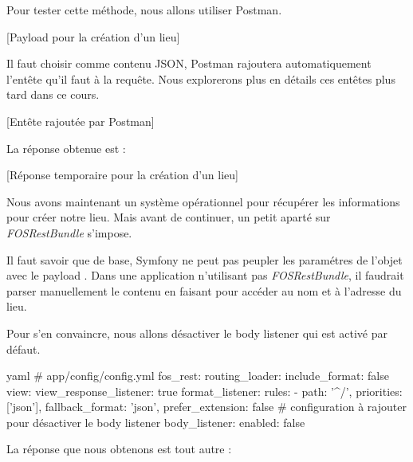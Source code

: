 \documentclass[big]{zmdocument}
\begin{document}
Pour tester cette méthode, nous allons utiliser Postman.



[Payload pour la création d'un lieu]


Il faut choisir comme contenu JSON, Postman rajoutera automatiquement l'entête  qu'il faut à la requête. Nous explorerons plus en détails ces entêtes plus tard dans ce cours.



[Entête rajoutée par Postman]


La réponse obtenue est :



[Réponse temporaire pour la création d'un lieu]


Nous avons maintenant un système opérationnel pour récupérer les informations pour créer notre lieu. Mais avant de continuer, un petit aparté sur \textit{FOSRestBundle} s'impose.





Il faut savoir que de base, Symfony ne peut pas peupler les paramétres de l'objet  avec le payload . Dans une application n'utilisant pas \textit{FOSRestBundle}, il faudrait parser manuellement le contenu en faisant  pour accéder au nom et à l'adresse du lieu.



Pour s'en convaincre, nous allons désactiver le body listener qui est activé par défaut.



\begin{CodeBlock}{yaml}
# app/config/config.yml
fos_rest:
    routing_loader:
        include_format: false
    view:
        view_response_listener: true
    format_listener:
        rules:
            - { path: '^/', priorities: ['json'], fallback_format: 'json', prefer_extension: false }
    # configuration à rajouter pour désactiver le body listener
    body_listener:
        enabled: false
\end{CodeBlock}



La réponse que nous obtenons est tout autre :
\end{document}
